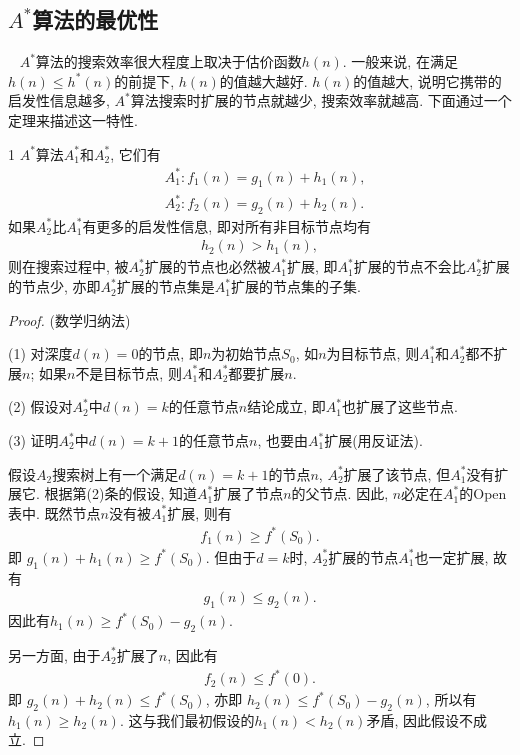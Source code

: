 \subsection{$A^*$算法的最优性}~{}
$A^*$算法的搜索效率很大程度上取决于估价函数$h(n)$. 一般来说, 在满足$h(n) \leq h^*(n)$的前提下, $h(n)$的值越大越好.
$h(n)$的值越大, 说明它携带的启发性信息越多, $A^*$算法搜索时扩展的节点就越少, 搜索效率就越高.
下面通过一个定理来描述这一特性.
\begin{mythm}{}{1}
    $A^*$算法$A_1^*$和$A_2^*$, 它们有
\begin{align}
    &A_1^*:  f_1(n)=g_1(n)+h_1(n),\\
    &A_2^*:  f_2(n)=g_2(n)+h_2(n).
\end{align}
如果$A_2^*$比$A_1^*$有更多的启发性信息, 即对所有非目标节点均有
\begin{align}
     h_2(n)>h_1(n),
\end{align}
则在搜索过程中, 被$A_2^*$扩展的节点也必然被$A_1^*$扩展, 即$A_1^*$扩展的节点不会比$A_2^*$扩展的节点少, 亦即$A_2^*$扩展的节点集是$A_1^*$扩展的节点集的子集.
\end{mythm}
\begin{proof}
(数学归纳法)

(1) 对深度$d(n)=0$的节点, 即$n$为初始节点$S_0$, 如$n$为目标节点, 则$A_1^*$和$A_2^*$都不扩展$n$; 如果$n$不是目标节点, 则$A_1^*$和$A_2^*$都要扩展$n$.

(2) 假设对$A_2^*$中$d(n)=k$的任意节点$n$结论成立, 即$A_1^*$也扩展了这些节点.

(3) 证明$A_2^*$中$d(n)=k+1$的任意节点$n$, 也要由$A_1^*$扩展(用反证法).

假设$A_2$搜索树上有一个满足$d(n)=k+1$的节点$n$, $A_2^*$扩展了该节点, 但$A_1^*$没有扩展它.
根据第(2)条的假设, 知道$A_1^*$扩展了节点$n$的父节点. 因此, $n$必定在$A_1^*$的Open表中. 既然节点$n$没有被$A_1^*$扩展, 则有
\begin{align}
     f_1(n)\geq f^*(S_0).
\end{align}
即 $g_1(n)+h_1(n)\geq f^*(S_0)$. 但由于$d=k$时, $A_2^*$扩展的节点$A_1^*$也一定扩展, 故有
\begin{align}
    g_1(n)\leq g_2(n).
\end{align}
因此有$h_1(n)\geq f^*(S_0)-g_2(n)$.

另一方面, 由于$A_2^ *$扩展了$n$, 因此有
\begin{align}
     f_2(n)\leq f^*(0).
\end{align}
即   $g_2(n)+h_2(n)\leq f^*(S_0)$, 亦即 $h_2(n)\leq f^*(S_0)-g_2(n)$, 所以有 $ h_1(n)\geq h_2(n)$.
这与我们最初假设的$h_1(n)<h_2(n)$矛盾, 因此假设不成立.
\end{proof}

